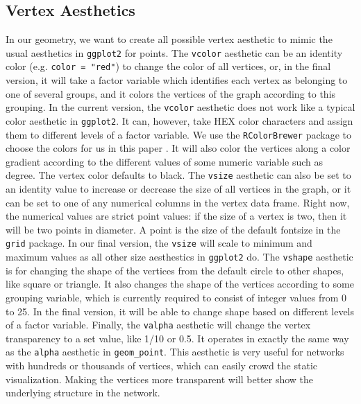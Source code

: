 \documentclass[11pt]{article}\usepackage[]{graphicx}\usepackage[]{color}
\begin{document}
  \subsection{Vertex Aesthetics}

  In our geometry, we want to create all possible vertex aesthetic to mimic the usual aesthetics in \texttt{ggplot2} for points. The \texttt{vcolor} aesthetic can be an identity color (e.g. \texttt{color = "red"}) to change the color of all vertices, or, in the final version, it will take a factor variable which identifies each vertex as belonging to one of several groups, and it colors the vertices of the graph according to this grouping. In the current version, the \texttt{vcolor} aesthetic does not work like a typical color aesthetic in \texttt{ggplot2}. It can, however, take HEX color characters and assign them to different levels of a factor variable. We use the \texttt{RColorBrewer} package to choose the colors for us in this paper \citep{RColorBrewer}. It will also color the vertices along a color gradient according to the different values of some numeric variable such as degree.  The vertex color defaults to black. %
  The \texttt{vsize} aesthetic can also be set to an identity value to increase or decrease the size of all vertices in the graph, or it can be set to one of any numerical columns in the vertex data frame. Right now, the numerical values are strict point values: if the size of a vertex is two, then it will be two points in diameter. A point is the size of the default fontsize in the \texttt{grid} package. In our final version, the \texttt{vsize} will scale to minimum and maximum values as all other size aesthestics in \texttt{ggplot2} do.  The \texttt{vshape} aesthetic is for changing the shape of the vertices from the default circle to other shapes, like square or triangle.  It also changes the shape of the vertices according to some grouping variable, which is currently required to consist of integer values from 0 to 25.  In the final version, it will be able to change shape based on different levels of a factor variable.  Finally, the \texttt{valpha} aesthetic will change the vertex transparency to a set value, like 1/10 or 0.5.  It operates in exactly the same way as the \texttt{alpha} aesthetic in \texttt{geom\_point}.  This aesthetic is very useful for networks with hundreds or thousands of vertices, which can easily crowd the static visualization. Making the vertices more transparent will better show the underlying structure in the network.
\end{document}
